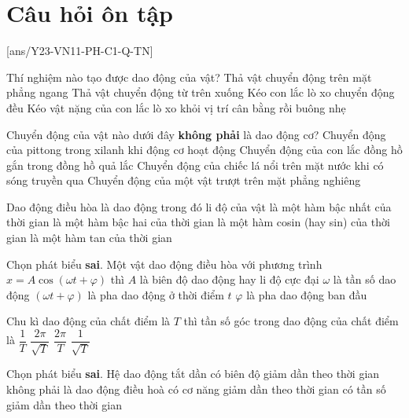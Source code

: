 \chapter{Câu hỏi ôn tập}
\setcounter{ex}{0}
[ans/Y23-VN11-PH-C1-Q-TN]
\begin{ex}
Thí nghiệm nào tạo được dao động của vật?	
	\choice
	{Thả vật chuyển động trên mặt phẳng ngang}
	{Thả vật chuyển động từ trên xuống}
	{Kéo con lắc lò xo chuyển động đều}
	{\True Kéo vật nặng của con lắc lò xo khỏi vị trí cân bằng rồi buông nhẹ}
	\loigiai{}
\end{ex}
\begin{ex}
	Chuyển động của vật nào dưới đây \textbf{không phải} là dao động cơ?
	\choice
	{Chuyển động của pittong trong xilanh khi động cơ hoạt động}
	{Chuyển động của con lắc đồng hồ gắn trong đồng hồ quả lắc}
	{Chuyển động của chiếc lá nổi trên mặt nước khi có sóng truyền qua}
	{\True Chuyển động của một vật trượt trên mặt phẳng nghiêng}
	\loigiai{}
\end{ex}
\begin{ex}
	Dao động điều hòa là dao động trong đó li độ của vật
	\choice
	{là một hàm bậc nhất của thời gian}
	{là một hàm bậc hai của thời gian}
	{\True là một hàm cosin (hay sin) của thời gian}
	{là một hàm tan của thời gian}
	\loigiai{}
\end{ex}
\begin{ex}
Chọn phát biểu \textbf{sai}. Một vật dao động điều hòa với phương trình $x=A\cos\left(\omega t+\varphi\right)$ thì 	
	\choice
	{$A$ là biên độ dao động hay li độ cực đại}
	{\True $\omega$ là tần số dao động}
	{$\left(\omega t+\varphi\right)$ là pha dao động ở thời điểm $t$}
	{$\varphi$ là pha dao động ban đầu}
\end{ex}
\begin{ex}
Chu kì dao động của chất điểm là $T$ thì tần số góc trong dao động của chất điểm là 	
	\choice
	{$\dfrac{1}{T}$}
	{$\dfrac{2\pi}{\sqrt{T}}$}
	{\True $\dfrac{2\pi}{T}$}
	{$\dfrac{1}{\sqrt{T}}$}
	\loigiai{}
\end{ex}
\begin{ex}
Chọn phát biểu \textbf{sai}. Hệ dao động tắt dần	
	\choice
	{có biên độ giảm dần theo thời gian}
	{không phải là dao động điều hoà}
	{có cơ năng giảm dần theo thời gian}
	{\True có tần số giảm dần theo thời gian}
	\loigiai{}
\end{ex}
